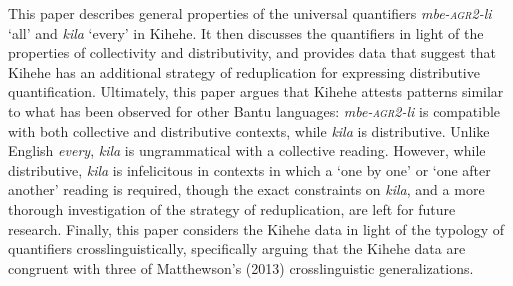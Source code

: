 \documentclass[letterpaper, 12pt]{article}
\begin{document}
This paper describes general properties of the universal quantifiers \textit{mbe-\textsc{agr2}-li} `all' and \textit{kila} `every' in Kihehe. It then discusses the quantifiers in light of the properties of collectivity and distributivity, and provides data that suggest that Kihehe has an additional strategy of reduplication for expressing distributive quantification. Ultimately, this paper argues that Kihehe attests patterns similar to what has been observed for other Bantu languages: \textit{mbe-\textsc{agr2}-li} is compatible with both collective and distributive contexts, while \textit{kila} is distributive. Unlike English \textit{every}, \textit{kila} is ungrammatical with a collective reading. However, while distributive, \textit{kila} is infelicitous in contexts in which a `one by one' or `one after another' reading is required, though the exact constraints on \textit{kila}, and a more thorough investigation of the strategy of reduplication, are left for future research. Finally, this paper considers the Kihehe data in light of the typology of quantifiers crosslinguistically, specifically arguing that the Kihehe data are congruent with three of Matthewson's (2013) crosslinguistic generalizations. 




\end{document}

